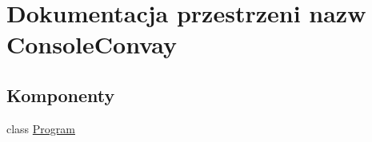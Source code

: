 \hypertarget{namespace_console_convay}{}\section{Dokumentacja przestrzeni nazw Console\+Convay}
\label{namespace_console_convay}
\subsection*{Komponenty}
\begin{DoxyCompactItemize}
\item 
class \hyperlink{class_console_convay_1_1_program}{Program}
\end{DoxyCompactItemize}

